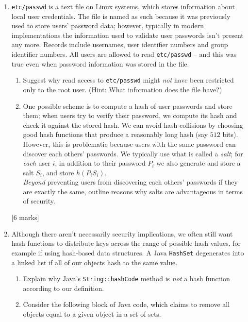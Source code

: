\documentclass[12pt, a4paper]{article}
\begin{document}
\begin{enumerate}
\item \texttt{etc/passwd} is a text file on Linux systems, which stores information about local user credentials. The file is named as such because it was previously used to store users' password data; however, typically in modern implementations the information used to validate user passwords isn't present any more. Records include usernames, user identifier numbers and group identifier numbers.
All users are allowed to read \texttt{etc/passwd} -- and this was true even when password information was stored in the file. 
\begin{enumerate}
\item Suggest why read access to \texttt{etc/passwd} might \textit{not} have been restricted only to the root user. (Hint: What information does the file have?)

\item One possible scheme is to compute a hash of user passwords and store them; when users try to verify their password, we compute its hash and check it against the stored hash. We can avoid hash collisions by choosing good hash functions that produce a reasonably long hash (say $512$ bits).
\\[12pt]
However, this is problematic because users with the same password can discover each others' passwords. We typically use what is called a \textit{salt}; for \textit{each} user $i$, in addition to their password $P_i$ we also generate and store a salt $S_i$, and store $h(P_i S_i)$.
\\[12pt]
\textit{Beyond} preventing users from discovering each others' passwords if they are exactly the same, outline reasons why salts are advantageous in terms of security.
\end{enumerate}

[6 marks]

\item Although there aren't necessarily security implications, we often still want hash functions to distribute keys across the range of possible hash values, for example if using hash-based data structures. A Java \texttt{HashSet} degenerates into a linked list if all of our objects hash to the same value.
\begin{enumerate}
\item Explain why Java's \texttt{String::hashCode} method is \textit{not} a hash function according to our definition. %

\item Consider the following block of Java code, which claims to remove all objects equal to a given object in a set of sets.


\end{enumerate}
\end{enumerate}
\end{document}
